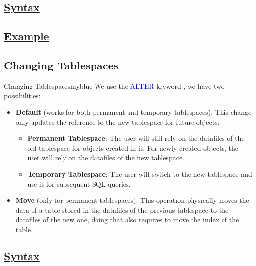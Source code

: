\vspace{0.15cm}
\subsection*{\underline{Syntax}}


\vspace{0.15cm}
\subsection*{\underline{Example}}



\vspace{0.25cm}

\subsection{Changing Tablespaces}
\begin{prettyBox}{Changing Tablespaces}{myblue}
    We use the \textcolor{blue}{ALTER} keyword , we have two possibilities:
\begin{itemize}
    \item \textbf{Default} (works for both permanent and temporary tablespaces): This change only updates the reference to the new tablespace for future objects.
    \begin{itemize}
        \item \textbf{Permanent Tablespace}: The user will still rely on the datafiles of the old tablespace for objects created in it. For newly created objects, the user will rely on the datafiles of the new tablespace.
        \item \textbf{Temporary Tablespace}: The user will switch to the new tablespace and use it for subsequent SQL queries.
    \end{itemize}
    \item \textbf{Move} (only for permanent tablespaces): This operation physically moves the data of a table stored in the datafiles of the previous
tablespace to the datafiles of the new one, doing that
        also requires to move the index of the table.
\end{itemize}
\end{prettyBox}

\vspace{0.15cm}
\subsection*{\underline{Syntax}}


